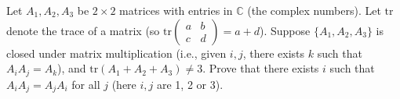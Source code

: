 Let $A_1, A_2, A_3$ be $2 \times 2$ matrices with entries in $\mathbb{C}$ (the
complex numbers). Let $\text{tr}$ denote the trace of a matrix (so $\text{tr}
\begin{pmatrix} a & b \\ c & d \end{pmatrix} = a + d$). Suppose $\{A_1,
A_2, A_3\}$ is closed under matrix multiplication (i.e., given $i, j$, there
exists $k$ such that $A_i A_j = A_k$), and $\text{tr}(A_1 + A_2 + A_3) \neq 3$.
Prove that there exists $i$ such that $A_i A_j = A_j A_i$ for all $j$ (here $i,
j$ are 1, 2 or 3).
